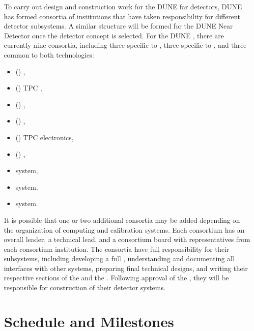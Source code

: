 To carry out design and construction work for the DUNE far detectors, DUNE has  formed consortia of institutions that have taken responsibility for different detector subsystems. A similar structure will be formed for the DUNE Near Detector once the detector concept is selected. For the DUNE , there are currently nine consortia, including three specific to \single, three specific to \dual, and three common to both technologies:
\begin{itemize}
\item (\single) , %
\item (\single) TPC , %
\item (\single) , %
\item (\dual) , %
\item (\dual) TPC electronics, %
\item (\dual) , %
\item {} system, %
\item {} system, %
\item {} system. %
\end{itemize}
It is possible that one or two additional consortia may be added depending on the organization of computing and calibration systems. Each consortium has an overall leader, a technical lead, and a consortium board with representatives from each consortium institution. The consortia have full responsibility for their subsystems, including developing a full , understanding and documenting all interfaces with other systems, preparing final technical designs, and writing their respective sections of the  and the . Following approval of the  , they will be responsible for construction of their detector systems. %


\section{Schedule and Milestones} 

